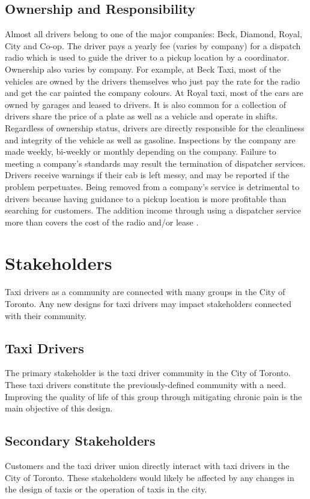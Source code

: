 \documentclass[11pt]{article}
\begin{document}
\subsection{Ownership and Responsibility}

Almost all drivers belong to one of the major companies: Beck, Diamond, Royal, City and
Co-op. The driver pays a yearly fee (varies by company) for a dispatch radio which is used to guide the 
driver to a pickup location by a coordinator. Ownership also varies by company. For example, 
at Beck Taxi, most of the vehicles are owned by the drivers themselves who just pay the 
rate for the radio and get the car painted the company colours. At Royal taxi, most of the 
cars are owned by garages and leased to drivers. It is also common for a collection of 
drivers share the price of a plate as well as a vehicle and operate in shifts. Regardless of   
ownership status, drivers are directly responsible for the cleanliness and integrity of the vehicle as well as gasoline. 
Inspections by the company are made weekly, bi-weekly or monthly depending on the company. 
Failure to meeting a company's standards may result the termination of dispatcher services. Drivers receive 
warnings if their cab is left messy, and may be reported if the problem perpetuates. Being removed from
a company's service is detrimental to drivers because having guidance to a pickup location
is more profitable than searching for customers. The addition income through using a dispatcher 
service more than covers the cost of the radio and/or lease \cite{thestar2012, Gowder2013}.

\section{Stakeholders}
\label{sec:stake}
Taxi drivers as a community are connected with many groups in the City
of Toronto. Any new designs for taxi drivers may impact
stakeholders connected with their community.
 
\subsection{Taxi Drivers}
The primary stakeholder is the taxi driver community in the City of
Toronto. These taxi drivers constitute the previously-defined community with a
need. Improving the quality of life of this group through mitigating
chronic pain is the main objective of this design.
 
\subsection{Secondary Stakeholders} 
Customers and the taxi driver union directly interact with taxi 
drivers in the City of Toronto. These stakeholders would likely be 
affected by any changes in the design of taxis or the operation of taxis 
in the city. 
\end{document}
